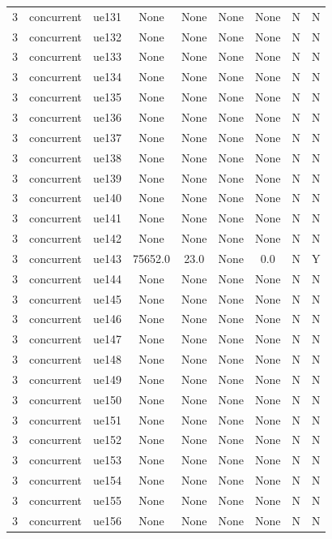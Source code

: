 \begin{table}[ht]
\begin{tabular}{|c|c|c|c|c|c|c|c|c|}
3 & concurrent & ue131 & None & None & None & None & N & N \\
3 & concurrent & ue132 & None & None & None & None & N & N \\
3 & concurrent & ue133 & None & None & None & None & N & N \\
3 & concurrent & ue134 & None & None & None & None & N & N \\
3 & concurrent & ue135 & None & None & None & None & N & N \\
3 & concurrent & ue136 & None & None & None & None & N & N \\
3 & concurrent & ue137 & None & None & None & None & N & N \\
3 & concurrent & ue138 & None & None & None & None & N & N \\
3 & concurrent & ue139 & None & None & None & None & N & N \\
3 & concurrent & ue140 & None & None & None & None & N & N \\
3 & concurrent & ue141 & None & None & None & None & N & N \\
3 & concurrent & ue142 & None & None & None & None & N & N \\
3 & concurrent & ue143 & 75652.0 & 23.0 & None & 0.0 & N & Y \\
3 & concurrent & ue144 & None & None & None & None & N & N \\
3 & concurrent & ue145 & None & None & None & None & N & N \\
3 & concurrent & ue146 & None & None & None & None & N & N \\
3 & concurrent & ue147 & None & None & None & None & N & N \\
3 & concurrent & ue148 & None & None & None & None & N & N \\
3 & concurrent & ue149 & None & None & None & None & N & N \\
3 & concurrent & ue150 & None & None & None & None & N & N \\
3 & concurrent & ue151 & None & None & None & None & N & N \\
3 & concurrent & ue152 & None & None & None & None & N & N \\
3 & concurrent & ue153 & None & None & None & None & N & N \\
3 & concurrent & ue154 & None & None & None & None & N & N \\
3 & concurrent & ue155 & None & None & None & None & N & N \\
3 & concurrent & ue156 & None & None & None & None & N & N \\

\end{tabular}
\end{table}
